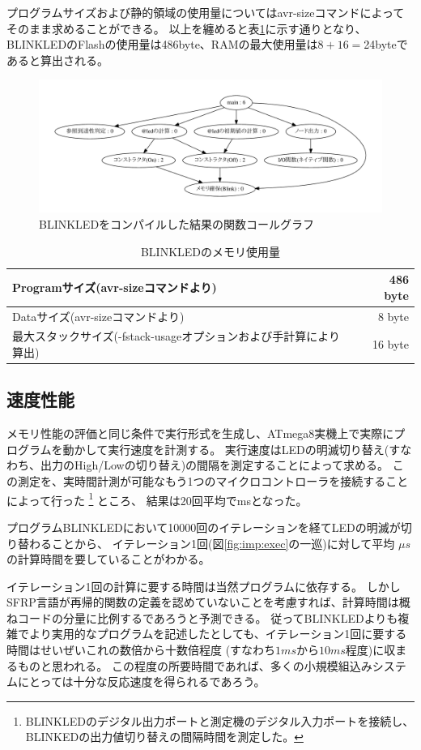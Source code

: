 プログラムサイズおよび静的領域の使用量についてはavr-sizeコマンドによってそのまま求めることができる。
以上を纏めると表\ref{fig:imp:size}に示す通りとなり、
BLINKLEDのFlashの使用量は486byte、RAMの最大使用量は$8+16=$24byteであると算出される。

\begin{figure}[h]
 \begin{center}
  \includegraphics[width=160mm]{figure/call_graph.pdf}
 \end{center}
 \caption{BLINKLEDをコンパイルした結果の関数コールグラフ}
 \label{fig:imp:call_graph}
\end{figure}

\begin{table}[h]
  \centering
  \begin{tabular}{l|r}
    Programサイズ(avr-sizeコマンドより) & 486 byte \\ \hline
    Dataサイズ(avr-sizeコマンドより) & 8 byte \\ \hline
    最大スタックサイズ(-fstack-usageオプションおよび手計算により算出)  & 16 byte \\ \hline
  \end{tabular}
\caption{BLINKLEDのメモリ使用量}
\label{fig:imp:size}
\end{table}


\subsection{速度性能}\label{sec:implementation:performance:speed}
メモリ性能の評価と同じ条件で実行形式を生成し、ATmega8実機上で実際にプログラムを動かして実行速度を計測する。
実行速度はLEDの明滅切り替え(すなわち、出力のHigh/Lowの切り替え)の間隔を測定することによって求める。
この測定を、実時間計測が可能なもう1つのマイクロコントローラを接続することによって行った
\footnote{BLINKLEDのデジタル出力ポートと測定機のデジタル入力ポートを接続し、
BLINKEDの出力値切り替えの間隔時間を測定した。}
ところ、
結果は20回平均でmsとなった。

プログラムBLINKLEDにおいて10000回のイテレーションを経てLEDの明滅が切り替わることから、
イテレーション1回(図\ref{fig:imp:exec}の一巡)に対して平均
$  \mu s$
の計算時間を要していることがわかる。

イテレーション1回の計算に要する時間は当然プログラムに依存する。
しかしSFRP言語が再帰的関数の定義を認めていないことを考慮すれば、計算時間は概ねコードの分量に比例するであろうと予測できる。
従ってBLINKLEDよりも複雑でより実用的なプログラムを記述したとしても、イテレーション1回に要する時間はせいぜいこれの数倍から十数倍程度
(すなわち$1ms$から$10ms$程度)に収まるものと思われる。
この程度の所要時間であれば、多くの小規模組込みシステムにとっては十分な反応速度を得られるであろう。
